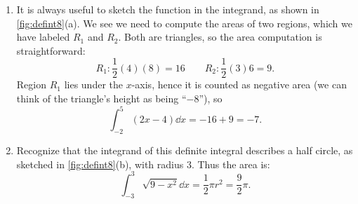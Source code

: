 \begin{example}
\solution
\begin{enumerate}
	\item	It is always useful to sketch the function in the integrand, as shown in \autoref{fig:defint8}(a). We see we need to compute the areas of two regions, which we have labeled $R_1$ and $R_2$. Both are triangles, so the area computation is straightforward:
	\[R_1: \frac12(4)(8) = 16 \qquad R_2: \frac12(3)6 = 9.\]
	Region $R_1$ lies under the $x$-axis, hence it is counted as negative area (we can think of the triangle's height as being ``$-8$''), so
	\[\int_{-2}^5(2x-4)\dd x = -16+9 = -7.\]
	\item	Recognize that the integrand of this definite integral describes a half circle, as sketched in \autoref{fig:defint8}(b), with radius 3. Thus the area is:
	\[\int_{-3}^3 \sqrt{9-x^2}\dd x = \frac12\pi r^2 = \frac 92\pi.\]
\end{enumerate}
\end{example}

